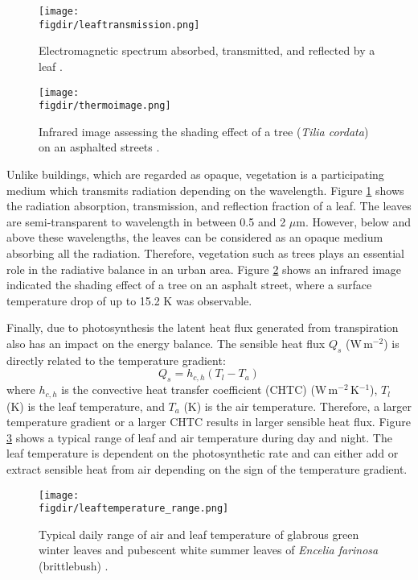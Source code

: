 \begin{figure}[p]
	\centering
	\texttt{[image: \\figdir/leaftransmission.png]}
	\caption{Electromagnetic spectrum absorbed, transmitted, and reflected by a leaf \citep{Lambers2008,nobel2009physicochemical}. }
	\label{fig:leaftransmission}
\end{figure}

\begin{figure}[p]
	\centering
	\texttt{[image: \\figdir/thermoimage.png]}
	\caption{Infrared image assessing the shading effect of a tree (\textit{Tilia cordata}) on an asphalted streets \citep{Gillner2015}. }
	\label{fig:thermoimage}
\end{figure}	

Unlike buildings, which are regarded as opaque, vegetation is a participating medium which transmits radiation depending on the wavelength. Figure \ref{fig:leaftransmission} shows the radiation absorption, transmission, and reflection fraction of a leaf. The leaves are semi-transparent to wavelength in between 0.5 and 2 $\mu$m. However, below and above these wavelengths, the leaves can be considered as an opaque medium absorbing all the radiation. Therefore, vegetation such as trees plays an essential role in the radiative balance in an urban area. Figure \ref{fig:thermoimage} shows an infrared image indicated the shading effect of a tree on an asphalt street, where a surface temperature drop of up to 15.2 K was observable.

Finally, due to photosynthesis the latent heat flux generated from transpiration also has an impact on the energy balance. The sensible heat flux $Q_s$ (W\,m$^{-2}$) is directly related to the temperature gradient:
\begin{equation}
Q_s = h_{c,h} \left(T_l - T_a\right)
\end{equation}
where $h_{c,h}$ is the convective heat transfer coefficient (CHTC) (W\,m$^{-2}$\,K$^{-1}$), $T_l$ (K) is the leaf temperature, and $T_a$ (K) is the air temperature. Therefore, a larger temperature gradient or a larger CHTC results in larger sensible heat flux. Figure \ref{fig:leaftemperature_range} shows a typical range of leaf and air temperature during day and night. The leaf temperature is dependent on the photosynthetic rate and can either add or extract sensible heat from air depending on the sign of the temperature gradient.

\begin{figure}[p]
	\centering
	\texttt{[image: \\figdir/leaftemperature\_range.png]}
	\caption{Typical daily range of air and leaf temperature of glabrous green winter leaves and pubescent white summer leaves of \textit{Encelia farinosa} (brittlebush) \citep{Lambers2008}. }
	\label{fig:leaftemperature_range}
\end{figure}

